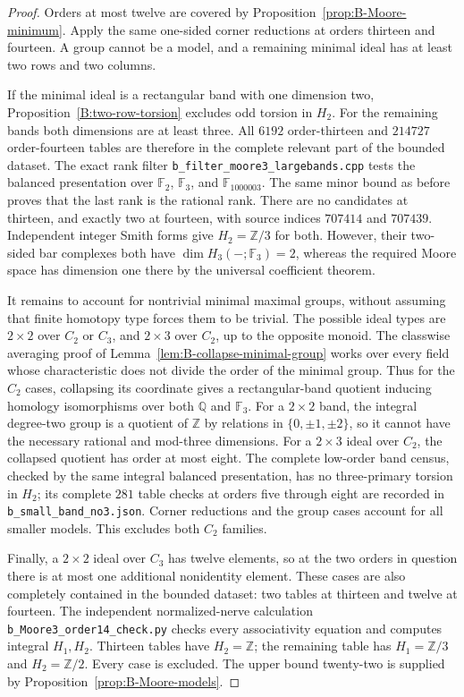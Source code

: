\begin{proof}
Orders at most twelve are covered by
Proposition~\ref{prop:B-Moore-minimum}.  Apply the same one-sided
corner reductions at orders thirteen and fourteen.  A group cannot
be a model, and a remaining minimal ideal has at least two rows
and two columns.

If the minimal ideal is a rectangular band with one dimension two,
Proposition~\ref{B:two-row-torsion} excludes odd torsion in $H_2$.
For the remaining bands both dimensions are at least three.
All $6192$ order-thirteen and $214727$ order-fourteen tables are
therefore in the complete relevant part of the bounded dataset.
The exact rank filter
\texttt{b\_filter\_moore3\_largebands.cpp} tests the balanced
presentation over $\mathbb F_2$, $\mathbb F_3$, and
$\mathbb F_{1000003}$.  The same minor bound as before proves
that the last rank is the rational rank.  There are no candidates
at thirteen, and exactly two at fourteen, with source indices
$707414$ and $707439$.  Independent integer Smith forms give
$H_2=\mathbb Z/3$ for both.  However, their two-sided bar complexes
both have $\dim H_3(-;\mathbb F_3)=2$, whereas the required Moore
space has dimension one there by the universal coefficient theorem.

It remains to account for nontrivial minimal maximal groups, without
assuming that finite homotopy type forces them to be trivial.
The possible ideal types are $2\times2$ over $C_2$ or $C_3$,
and $2\times3$ over $C_2$, up to the opposite monoid.
The classwise averaging proof of
Lemma~\ref{lem:B-collapse-minimal-group} works over every field
whose characteristic does not divide the order of the minimal
group.  Thus for the $C_2$ cases, collapsing its coordinate gives
a rectangular-band quotient inducing homology isomorphisms over
both $\mathbb Q$ and $\mathbb F_3$.
For a $2\times2$ band, the integral degree-two group is a quotient
of $\mathbb Z$ by relations in $\{0,\pm1,\pm2\}$, so it cannot
have the necessary rational and mod-three dimensions.
For a $2\times3$ ideal over $C_2$, the collapsed quotient has
order at most eight.  The complete low-order band census, checked
by the same integral balanced presentation, has no three-primary
torsion in $H_2$; its complete $281$ table checks at orders five
through eight are recorded in \texttt{b\_small\_band\_no3.json}.
Corner reductions and the group cases account for all smaller models.
This excludes both $C_2$ families.

Finally, a $2\times2$ ideal over $C_3$ has twelve elements, so
at the two orders in question there is at most one additional
nonidentity element.  These cases are also completely contained
in the bounded dataset: two tables at thirteen and twelve at
fourteen.  The independent normalized-nerve calculation
\texttt{b\_Moore3\_order14\_check.py} checks every associativity
equation and computes integral $H_1,H_2$.  Thirteen tables have
$H_2=\mathbb Z$; the remaining table has $H_1=\mathbb Z/3$
and $H_2=\mathbb Z/2$.  Every case is excluded.
The upper bound twenty-two is supplied by
Proposition~\ref{prop:B-Moore-models}.
\end{proof}


